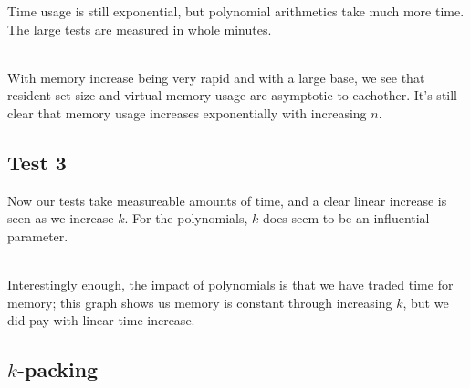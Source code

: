 \documentclass[a4paper, titlepage]{article}
\begin{document}
Time usage is still exponential, but polynomial arithmetics take much more time. The large tests are measured in whole minutes.
\\\\

With memory increase being very rapid and with a large base, we see that resident set size and virtual memory usage are asymptotic to eachother. It's still clear that memory usage increases exponentially with increasing $n$.

\subsection*{Test 3}


Now our tests take measureable amounts of time, and a clear linear increase is seen as we increase $k$. For the polynomials, $k$ does seem to be an influential parameter.
\\\\

Interestingly enough, the impact of polynomials is that we have traded time for memory; this graph shows us memory is constant through increasing $k$, but we did pay with linear time increase.

\subsection{$k$-packing}
\end{document}
